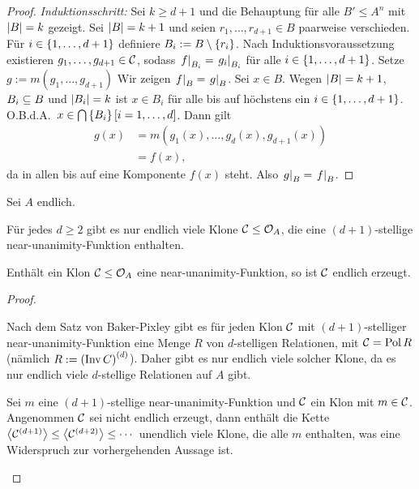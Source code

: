 \documentclass{book}
\begin{document}
\begin{proof}
\emph{Induktionsschritt:} Sei $k\geq d+1$ und die Behauptung für alle $B'\leq A^n$ mit $\left|B\right|=k$ gezeigt. Sei $\left|B\right| = k+1$ und seien $r_1,\ldots,r_{d+1}\in B$ paarweise verschieden. Für $i\in\left\{1,\ldots,d+1\right\}$ definiere $B_i:=B\setminus\left\{r_i\right\}$. Nach Induktionsvoraussetzung existieren $g_1,\ldots,g_{d+1}\in\mathcal{C}$, sodass $\left. f\right\vert_{B_i}=\left. g_i\right\vert_{B_i}$ für alle $i\in\left\{1,\ldots,d+1\right\}$. Setze $g:=m(g_1,\ldots,g_{d+1})$ Wir zeigen $\left. f\right\vert_B=\left. g\right\vert_{B}$. Sei $x\in B$. Wegen $\left|B\right| = k+1$, $B_i\subseteq B$ und $\left|B_i\right| = k$ ist $x\in B_i$ für alle bis auf höchstens ein $i\in\left\{1,\ldots,d+1\right\}$.
O.B.d.A.~$x\in \bigcap\left\{B_i\right\}[i=1,\ldots,d]$. Dann gilt
\begin{align*}
    g(x) &= m(g_1(x),\ldots,g_d(x),g_{d+1}(x))\\
    &= f(x),
\end{align*}
da in allen bis auf eine Komponente $f(x)$ steht. Also $\left. g\right\vert_B=\left. f\right\vert_B$.
\end{proof}

\begin{corollary}
    Sei $A$ endlich.
    \begin{statements}
            \item Für jedes $d\geq 2$ gibt es nur endlich viele Klone $\mathcal{C}\leq \mathcal{O}_A$, die eine $(d+1)$-stellige near-unanimity-Funktion enthalten.
            \item Enthält ein Klon $\mathcal{C}\leq \mathcal{O}_A$ eine near-unanimity-Funktion, so ist $\mathcal{C}$ endlich erzeugt.
    \end{statements}
\end{corollary}

\begin{proof}
    \begin{statements}
            \item Nach dem Satz von Baker-Pixley gibt es für jeden Klon $\mathcal{C}$ mit $(d+1)$-stelliger near-unanimity-Funktion eine Menge $R$ von $d$-stelligen Relationen, mit $\mathcal{C}=\mathop\mathrm{Pol} R$ (nämlich $R:={(\mathop\mathrm{Inv} C)}^{(d)}$). Daher gibt es nur endlich viele solcher Klone, da es nur endlich viele $d$-stellige Relationen auf $A$ gibt.
            \item Sei $m$ eine $(d+1)$-stellige near-unanimity-Funktion und $\mathcal{C}$ ein Klon mit $m\in\mathcal{C}$. Angenommen $\mathcal{C}$ sei nicht endlich erzeugt, dann enthält die Kette $\gen{\cC^{(d+1)}}\leq \gen{\cC^{(d+2)}} \leq \cdots$ unendlich viele Klone, die alle $m$ enthalten, was eine Widerspruch zur vorhergehenden Aussage ist.
    \end{statements}
\end{proof}
\end{document}
